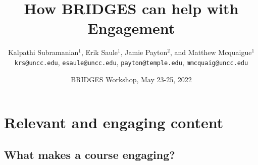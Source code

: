 \documentclass[aspectratio=169]{beamer}
\title{How BRIDGES can help with Engagement}
\subtitle{}
\author{Kalpathi Subramanian$^1$, Erik Saule$^1$, Jamie Payton$^2$, and Matthew Mcquaigue$^1$ \\\texttt{krs@uncc.edu}, \texttt{esaule@uncc.edu}, \texttt{payton@temple.edu}, \texttt{mmcquaig@uncc.edu}}
\institute{$^1$The University of North Carolina at Charlotte\\$^2$Temple University}
\date{BRIDGES Workshop, May 23-25, 2022}
\begin{document}
\begin{frame}
\titlepage
\end{frame}




\section{Relevant and engaging content}
	


\subsection{What makes a course engaging?}
\end{document}
